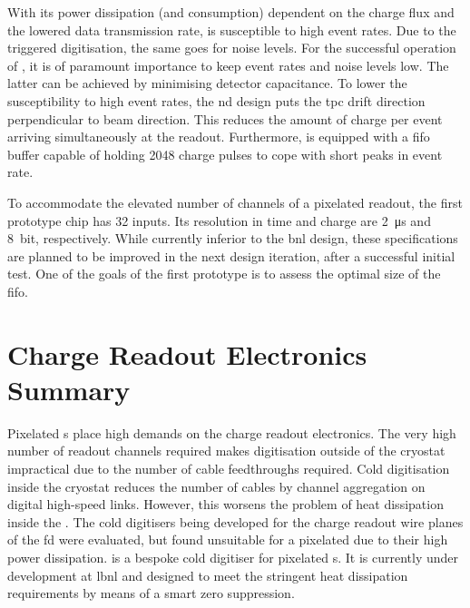 With its power dissipation (and consumption) dependent on the charge flux and the lowered data transmission rate, \larpix{} is susceptible to high event rates.
Due to the triggered digitisation, the same goes for noise levels.
For the successful operation of \larpix{}, it is of paramount importance to keep event rates and noise levels low.
The latter can be achieved by minimising detector capacitance.
To lower the susceptibility to high event rates, the \dune{} \gls{nd} design puts the \gls{tpc} drift direction perpendicular to beam direction.
This reduces the amount of charge per event arriving simultaneously at the readout.
Furthermore, \larpix{} is equipped with a \gls{fifo} buffer capable of holding \num{2048} charge pulses to cope with short peaks in event rate.

To accommodate the elevated number of channels of a pixelated readout, the first \larpix{} prototype chip has \num{32} inputs.
Its resolution in time and charge are \SI{2}{\micro\second} and \SI{8}{bit}, respectively.
While currently inferior to the \gls{bnl} design, these specifications are planned to be improved in the next design iteration, after a successful initial test.
One of the goals of the first prototype is to assess the optimal size of the \gls{fifo}.~\cite{danLarpix}


\section{Charge Readout Electronics Summary}
\label{sec:studies_electronics-summary}

Pixelated \lartpc{}s place high demands on the charge readout electronics.
The very high number of readout channels required makes digitisation outside of the cryostat impractical due to the number of cable feedthroughs required.
Cold digitisation inside the cryostat reduces the number of cables by channel aggregation on digital high-speed links.
However, this worsens the problem of heat dissipation inside the \lar{}.
The cold digitisers being developed for the charge readout wire planes of the \dune{} \gls{fd} were evaluated, but found unsuitable for a pixelated \lartpc{} due to their high power dissipation.
\larpix{} is a bespoke cold digitiser for pixelated \lartpc{}s.
It is currently under development at \gls{lbnl} and designed to meet the stringent heat dissipation requirements by means of a smart zero suppression.